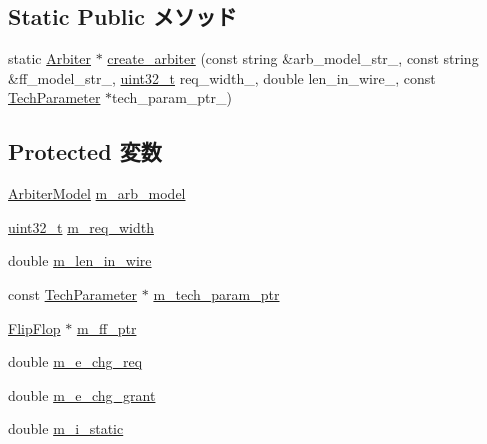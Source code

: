 \subsection*{Static Public メソッド}
\begin{DoxyCompactItemize}
\item 
static \hyperlink{classArbiter}{Arbiter} $\ast$ \hyperlink{classArbiter_a6482e81df871b0da383d2a5b4018fe62}{create\_\-arbiter} (const string \&arb\_\-model\_\-str\_\-, const string \&ff\_\-model\_\-str\_\-, \hyperlink{Type_8hh_a435d1572bf3f880d55459d9805097f62}{uint32\_\-t} req\_\-width\_\-, double len\_\-in\_\-wire\_\-, const \hyperlink{classTechParameter}{TechParameter} $\ast$tech\_\-param\_\-ptr\_\-)
\end{DoxyCompactItemize}
\subsection*{Protected 変数}
\begin{DoxyCompactItemize}
\item 
\hyperlink{classArbiter_a7c7da240d2e3c4e80b6a4ff22a3a2ce5}{ArbiterModel} \hyperlink{classArbiter_af64818aa60298e65f9b72a0a5663a7db}{m\_\-arb\_\-model}
\item 
\hyperlink{Type_8hh_a435d1572bf3f880d55459d9805097f62}{uint32\_\-t} \hyperlink{classArbiter_ab685e23a6185c3ad52cd5184aa3dbb01}{m\_\-req\_\-width}
\item 
double \hyperlink{classArbiter_aff2fda531349c91521ef8a9ae4fdabb7}{m\_\-len\_\-in\_\-wire}
\item 
const \hyperlink{classTechParameter}{TechParameter} $\ast$ \hyperlink{classArbiter_a11d1644aa2bfe0e16783dface6fadf13}{m\_\-tech\_\-param\_\-ptr}
\item 
\hyperlink{classFlipFlop}{FlipFlop} $\ast$ \hyperlink{classArbiter_a66dbdf17fa219f98da06b917f5a85354}{m\_\-ff\_\-ptr}
\item 
double \hyperlink{classArbiter_ab549eef755fac286910fdeb870312842}{m\_\-e\_\-chg\_\-req}
\item 
double \hyperlink{classArbiter_a69f85c812906bd8ac6e8f44698c2df4a}{m\_\-e\_\-chg\_\-grant}
\item 
double \hyperlink{classArbiter_a16f0c9e5942378eab4d83da3c61aba7f}{m\_\-i\_\-static}
\end{DoxyCompactItemize}


